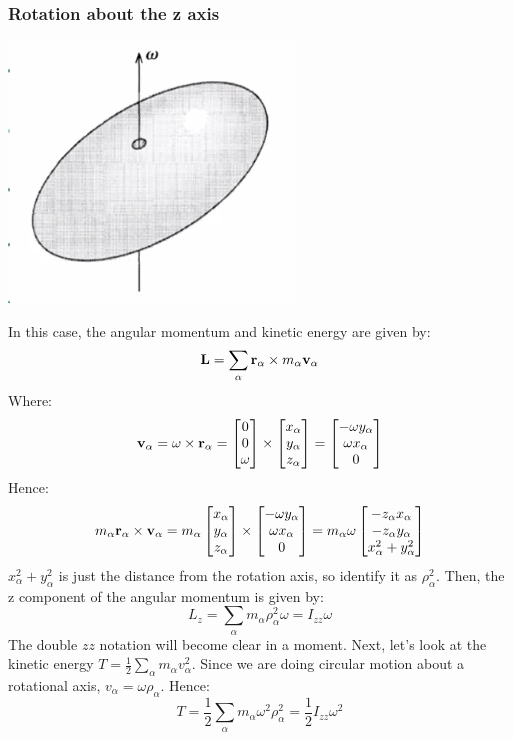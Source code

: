 \subsubsection{Rotation about the z axis}
\begin{center}
    \includegraphics[scale=1]{Lecture-17/l17-img5.png}
\end{center}
In this case, the angular momentum and kinetic energy are given by:
\[\mathbf{L} = \sum_\alpha \mathbf{r}_\alpha \times m_\alpha \mathbf{v}_\alpha\]
Where:
\[\mathbf{v}_\alpha = \mathbf{\omega} \times \mathbf{r}_\alpha = \begin{bmatrix}0 \\ 0 \\ \omega\end{bmatrix} \times \begin{bmatrix}x_\alpha \\ y_\alpha \\ z_\alpha\end{bmatrix} = \begin{bmatrix}-\omega y_\alpha \\ \omega x_\alpha \\ 0\end{bmatrix}\]
Hence:
\[m_\alpha \mathbf{r}_\alpha \times \mathbf{v}_\alpha = m_\alpha \begin{bmatrix}x_\alpha \\ y_\alpha \\ z_\alpha\end{bmatrix} \times \begin{bmatrix}-\omega y_\alpha \\ \omega x_\alpha \\ 0\end{bmatrix} = m_\alpha\omega\begin{bmatrix}-z_\alpha x_\alpha \\ -z_\alpha y_\alpha \\ x_\alpha^2 + y_\alpha^2\end{bmatrix}\] 
$x_\alpha^2 + y_\alpha^2$ is just the distance from the rotation axis, so identify it as $\rho_\alpha^2$. Then, the z component of the angular momentum is given by:
\[L_{z} = \sum_\alpha m_\alpha\rho_\alpha^2\omega = I_{zz}\omega\]
The double $zz$ notation will become clear in a moment. \newline Next, let's look at the kinetic energy $T = \frac{1}{2}\sum_\alpha m_\alpha v_\alpha^2$. Since we are doing circular motion about a rotational axis, $v_\alpha = \omega \rho_\alpha$. Hence:
\[T = \frac{1}{2} \sum_\alpha m_\alpha\omega^2 \rho_\alpha^2 = \frac{1}{2}I_{zz}\omega^2\]
